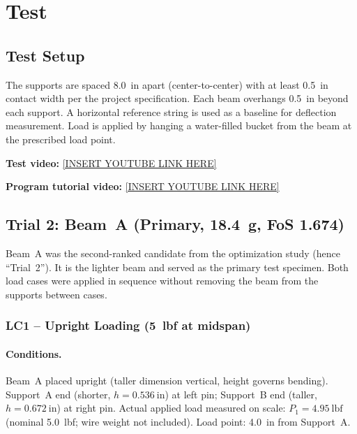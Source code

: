 \documentclass[11pt,letterpaper]{article}
\begin{document}
\section{Test}
\label{sec:test}

\subsection{Test Setup}

The supports are spaced 8.0~in apart (center-to-center) with at least 0.5~in
contact width per the project specification.  Each beam overhangs 0.5~in
beyond each support.  A horizontal reference string is used as a baseline
for deflection measurement.  Load is applied by hanging a water-filled bucket
from the beam at the prescribed load point.

\medskip\noindent
\textbf{Test video:} \url{[INSERT YOUTUBE LINK HERE]}

\medskip\noindent
\textbf{Program tutorial video:} \url{[INSERT YOUTUBE LINK HERE]}

\subsection{Trial 2: Beam~A (Primary, 18.4~g, FoS 1.674)}

Beam~A was the second-ranked candidate from the optimization study (hence
``Trial~2'').  It is the lighter beam and served as the primary test specimen.
Both load cases were applied in sequence without removing the beam from the
supports between cases.

\subsubsection{LC1 -- Upright Loading (5~lbf at midspan)}

\paragraph{Conditions.}
Beam~A placed upright (taller dimension vertical, height governs bending).
Support~A end (shorter, $h = 0.536\ \mathrm{in}$) at left pin;
Support~B end (taller, $h = 0.672\ \mathrm{in}$) at right pin.
Actual applied load measured on scale: $P_1 = 4.95\ \mathrm{lbf}$
(nominal 5.0~lbf; wire weight not included).
Load point: 4.0~in from Support~A.
\end{document}

